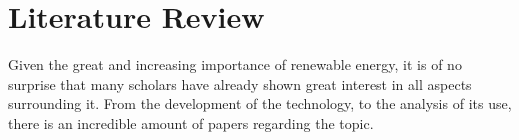 \section{Literature Review}
Given the great and increasing importance of renewable energy, it is of no surprise that many scholars have already shown great interest in all aspects surrounding it. From the development of the technology, to the analysis of its use, there is an incredible amount of papers regarding the topic. 
